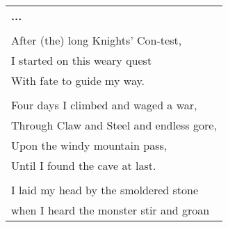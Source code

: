 \documentclass{article}
\begin{document}
\begin{center}
\begin{tabular}{l}
\textbf{...} \\
\\
After (the) long Knights' Con-test, \\
I started on this weary quest \\
With fate to guide my way. \\
\\ %
Four days I climbed and waged a war, \\
Through Claw and Steel and endless gore, \\
Upon the windy mountain pass, \\
Until I found the cave at last. \\
\\
I laid my head by the smoldered stone \\
when I heard the monster stir and groan \\
\end{tabular}
\end{center}
\end{document}

